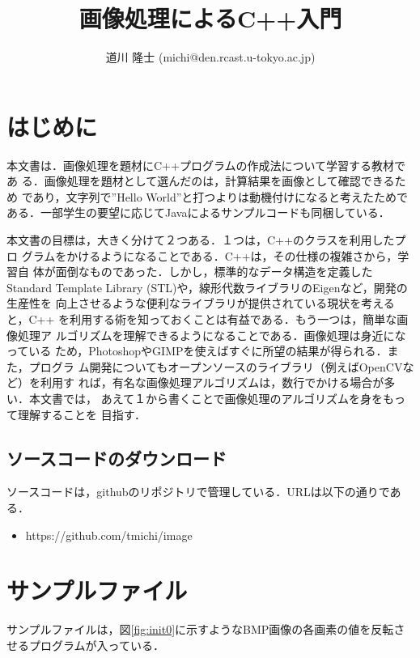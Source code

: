 ﻿\documentclass[11pt]{jsarticle}
\title{{\gt 画像処理によるC++入門}}
\author{道川 隆士 (michi@den.rcast.u-tokyo.ac.jp)}
\begin{document}
\maketitle
\section{はじめに}
本文書は．画像処理を題材にC++プログラムの作成法について学習する教材であ
る．画像処理を題材として選んだのは，計算結果を画像として確認できるため
であり，文字列で''Hello World''と打つよりは動機付けになると考えたためで
ある．一部学生の要望に応じてJavaによるサンプルコードも同梱している．

本文書の目標は，大きく分けて２つある．１つは，C++のクラスを利用したプロ
グラムをかけるようになることである．C++は，その仕様の複雑さから，学習自
体が面倒なものであった．しかし，標準的なデータ構造を定義したStandard
Template Library (STL)や，線形代数ライブラリのEigenなど，開発の生産性を
向上させるような便利なライブラリが提供されている現状を考えると，C++
を利用する術を知っておくことは有益である．もう一つは，簡単な画像処理ア
ルゴリズムを理解できるようになることである．画像処理は身近になっている
ため，PhotoshopやGIMPを使えばすぐに所望の結果が得られる．また，プログラ
ム開発についてもオープンソースのライブラリ（例えばOpenCVなど）を利用す
れば，有名な画像処理アルゴリズムは，数行でかける場合が多い．本文書では，
あえて１から書くことで画像処理のアルゴリズムを身をもって理解することを
目指す．

\subsection{ソースコードのダウンロード}
ソースコードは，githubのリポジトリで管理している．URLは以下の通りである．
\begin{itemize}
\item https://github.com/tmichi/image
\end{itemize}

\section{サンプルファイル}
サンプルファイルは，図\ref{fig:init0}に示すようなBMP画像の各画素の値を反転させるプログラムが入っている．
\end{document}

